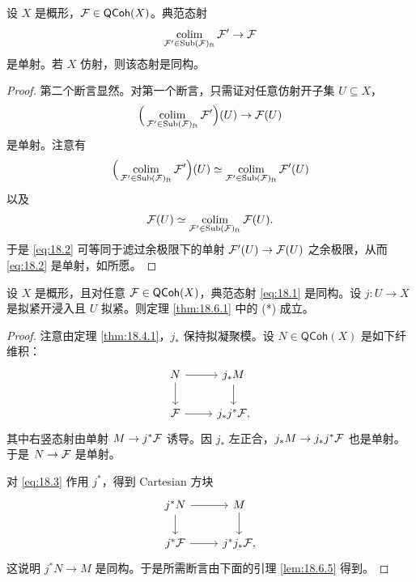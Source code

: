 \begin{lemma}\label{lem:18.6.3}
设 $X$ 是概形，$\mathcal{F}\in\mathsf{QCoh}(X)$。典范态射
\begin{equation}\label{eq:18.1}
\operatorname*{colim}_{\mathcal{F}'\in\mathrm{Sub}(\mathcal{F})_{\mathrm{ft}}}\mathcal{F}'\to\mathcal{F}
\end{equation}
是单射。若 $X$ 仿射，则该态射是同构。
\end{lemma}

\begin{proof}
第二个断言显然。对第一个断言，只需证对任意仿射开子集 $U\subseteq X$，
\begin{equation}\label{eq:18.2}
\Big(\operatorname*{colim}_{\mathcal{F}'\in\mathrm{Sub}(\mathcal{F})_{\mathrm{ft}}}\mathcal{F}'\Big)(U)\to\mathcal{F}(U)
\end{equation}
是单射。注意有
\[
\Big(\operatorname*{colim}_{\mathcal{F}'\in\mathrm{Sub}(\mathcal{F})_{\mathrm{ft}}}\mathcal{F}'\Big)(U)\simeq\operatorname*{colim}_{\mathcal{F}'\in\mathrm{Sub}(\mathcal{F})_{\mathrm{ft}}}\mathcal{F}'(U)
\]
以及
\[
\mathcal{F}(U)\simeq\operatorname*{colim}_{\mathcal{F}'\in\mathrm{Sub}(\mathcal{F})_{\mathrm{ft}}}\mathcal{F}(U).
\]
于是 \eqref{eq:18.2} 可等同于滤过余极限下的单射 $\mathcal{F}'(U)\to\mathcal{F}(U)$ 之余极限，从而 \eqref{eq:18.2} 是单射，如所愿。
\end{proof}

\begin{lemma}\label{lem:18.6.4}
设 $X$ 是概形，且对任意 $\mathcal{F}\in\mathsf{QCoh}(X)$，典范态射 \eqref{eq:18.1} 是同构。设 $j:U\to X$ 是拟紧开浸入且 $U$ 拟紧。则定理 \ref{thm:18.6.1} 中的 (*) 成立。
\end{lemma}

\begin{proof}
注意由定理 \ref{thm:18.4.1}，$j_*$ 保持拟凝聚模。设 $N\in\mathsf{QCoh}(X)$ 是如下纤维积：
\begin{equation}\label{eq:18.3}
\begin{tikzcd}
N \arrow[r] \arrow[d] & j_*M \arrow[d] \\
\cF \arrow[r] & j_*j^*\cF,
\end{tikzcd}
\end{equation}
其中右竖态射由单射 $M\to j^*\mathcal{F}$ 诱导。因 $j_*$ 左正合，$j_*M\to j_*j^*\mathcal{F}$ 也是单射。于是 $N\to\mathcal{F}$ 是单射。

对 \eqref{eq:18.3} 作用 $j^*$，得到 Cartesian 方块
\[
\begin{tikzcd}
j^*N \arrow[r] \arrow[d] & M \arrow[d] \\
j^*\cF \arrow[r] & j^*j_*\cF,
\end{tikzcd}
\]
这说明 $j^*N\to M$ 是同构。于是所需断言由下面的引理 \ref{lem:18.6.5} 得到。
\end{proof}

